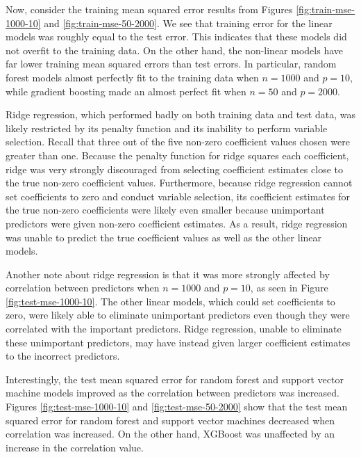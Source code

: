 \documentclass{article}
\begin{document}
Now, consider the training mean squared error results from Figures \ref{fig:train-mse-1000-10} and \ref{fig:train-mse-50-2000}. We see that training error for the linear models was roughly equal to the test error. This indicates that these models did not overfit to the training data. On the other hand, the non-linear models have far lower training mean squared errors than test errors. In particular, random forest models almost perfectly fit to the training data when $n = 1000$ and $p = 10$, while gradient boosting made an almost perfect fit when $n = 50$ and $p = 2000$.

Ridge regression, which performed badly on both training data and test data, was likely restricted by its penalty function and its inability to perform variable selection. Recall that three out of the five non-zero coefficient values chosen were greater than one. Because the penalty function for ridge squares each coefficient, ridge was very strongly discouraged from selecting coefficient estimates close to the true non-zero coefficient values. Furthermore, because ridge regression cannot set coefficients to zero and conduct variable selection, its coefficient estimates for the true non-zero coefficients were likely even smaller because unimportant predictors were given non-zero coefficient estimates. As a result, ridge regression was unable to predict the true coefficient values as well as the other linear models.

Another note about ridge regression is that it was more strongly affected by correlation between predictors when $n = 1000$ and $p = 10$, as seen in Figure \ref{fig:test-mse-1000-10}. The other linear models, which could set coefficients to zero, were likely able to eliminate unimportant predictors even though they were correlated with the important predictors. Ridge regression, unable to eliminate these unimportant predictors, may have instead given larger coefficient estimates to the incorrect predictors.

Interestingly, the test mean squared error for random forest and support vector machine models improved as the correlation between predictors was increased. Figures \ref{fig:test-mse-1000-10} and \ref{fig:test-mse-50-2000} show that the test mean squared error for random forest and support vector machines decreased when correlation was increased. On the other hand, XGBoost was unaffected by an increase in the correlation value.
\end{document}
